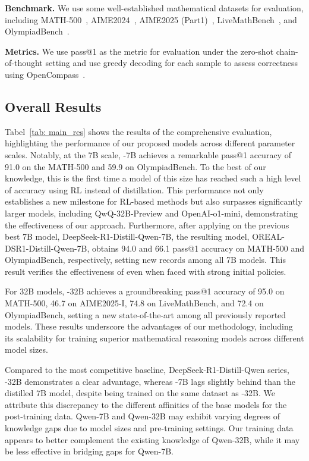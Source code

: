 \noindent\textbf{Benchmark.}
We use some well-established mathematical datasets for evaluation, including MATH-500~\cite{hendrycks2021measuring}, AIME2024~\cite{AIME2024}, AIME2025 (Part1)~\cite{AIME2024}, LiveMathBench~\cite{liu2024your}, and OlympiadBench~\cite{he2024olympiadbench}.

\noindent\textbf{Metrics.}
We use pass@1 as the metric for evaluation under the zero-shot chain-of-thought setting and use greedy decoding for each sample to assess correctness using OpenCompass~\cite{2023opencompass}.



\subsection{Overall Results}

Tabel~\ref{tab: main_res} shows the results of the comprehensive evaluation, highlighting the performance of our proposed models across different parameter scales. 
Notably, at the 7B scale, \methodname{}-7B achieves a remarkable pass@1 accuracy of 91.0 on the MATH-500 and 59.9 on OlympiadBench. 
To the best of our knowledge, this is the first time a model of this size has reached such a high level of accuracy using RL instead of distillation. 
This performance not only establishes a new milestone for RL-based methods but also surpasses significantly larger models, including QwQ-32B-Preview and OpenAI-o1-mini, demonstrating the effectiveness of our approach.
Furthermore, after applying \methodname{} on the previous best 7B model, DeepSeek-R1-Distill-Qwen-7B, the resulting model, OREAL-DSR1-Distill-Qwen-7B, obtains 94.0 and 66.1 pass@1 accuracy on MATH-500 and OlympiadBench, respectively, setting new records among all 7B models. This result verifies the effectiveness of \methodname{} even when faced with strong initial policies.

For 32B models, \methodname{}-32B achieves a groundbreaking pass@1 accuracy of 95.0 on MATH-500, 46.7 on AIME2025-I, 74.8 on LiveMathBench, and 72.4 on OlympiadBench, setting a new state-of-the-art among all previously reported models.
These results underscore the advantages of our methodology, including its scalability for training superior mathematical reasoning models across different model sizes.

Compared to the most competitive baseline, DeepSeek-R1-Distill-Qwen series, \methodname{}-32B demonstrates a clear advantage, whereas \methodname{}-7B lags slightly behind than the distilled 7B model, despite being trained on the same dataset as \methodname{}-32B. We attribute this discrepancy to the different affinities of the base models for the post-training data. Qwen-7B and Qwen-32B may exhibit varying degrees of knowledge gaps due to model sizes and pre-training settings. Our training data appears to better complement the existing knowledge of Qwen-32B, while it may be less effective in bridging gaps for Qwen-7B.

